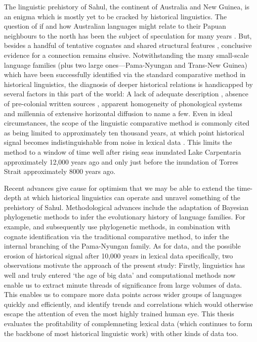 The linguistic prehistory of Sahul, the continent of Australia and New Guinea, is an enigma which is mostly yet to be cracked by historical linguistics. The question of if and how Australian languages might relate to their Papuan neighbours to the north has been the subject of speculation for many years \autocites[e.g.][]{ogrady_languages_1966}{wurm_papuan_1975}. But, besides a handful of tentative cognates \autocite{foley_papuan_1986} and shared structural features \autocites{nichols_sprung_1997}{reesink_explaining_2009}, conclusive evidence for a connection remains elusive. Notwithstanding the many small-scale language families (plus two large ones---Pama-Nyungan and Trans-New Guinea) which have been successfully identified via the standard comparative method in historical linguistics, the diagnosis of deeper historical relations is handicapped by several factors in this part of the world: A lack of adequate description \autocite{bowern_computational_2012}, absence of pre-colonial written sources \autocite{foley_papuan_1986}, apparent homogeneity of phonological systems \autocite{baker_word_2014} and millennia of extensive horizontal diffusion \autocites{foley_papuan_1986}{dixon_australian_2002} to name a few. Even in ideal circumstances, the scope of the linguistic comparative method is commonly cited as being limited to approximately ten thousand years, at which point historical signal becomes indistinguishable from noise in lexical data \autocite{nichols_sprung_1997}. This limits the method to a window of time well after rising seas inundated Lake Carpentaria approximately 12,000 years ago and only just before the inundation of Torres Strait approximately 8000 years ago.

Recent advances give cause for optimism that we may be able to extend the time-depth at which historical linguistics can operate and unravel something of the prehistory of Sahul. Methodological advances include the adaptation of Bayesian phylogenetic methods to infer the evolutionary history of language families. For example, \textcite{bowern_computational_2012} and subsequently \textcite{bouckaert_origin_2018} use phylogenetic methods, in combination with cognate identification via the traditional comparative method, to infer the internal branching of the Pama-Nyungan family. As for data, and the possible erosion of historical signal after 10,000 years in lexical data specifically, two observations motivate the approach of the present study: Firstly, linguistics has well and truly entered `the age of big data' and computational methods now enable us to extract minute threads of significance from large volumes of data. This enables us to compare more data points across wider groups of languages quickly and efficiently, and identify trends and correlations which would otherwise escape the attention of even the most highly trained human eye. This thesis evaluates the profitability of complemneting lexical data (which continues to form the backbone of most historical linguistic work) with other kinds of data too.

